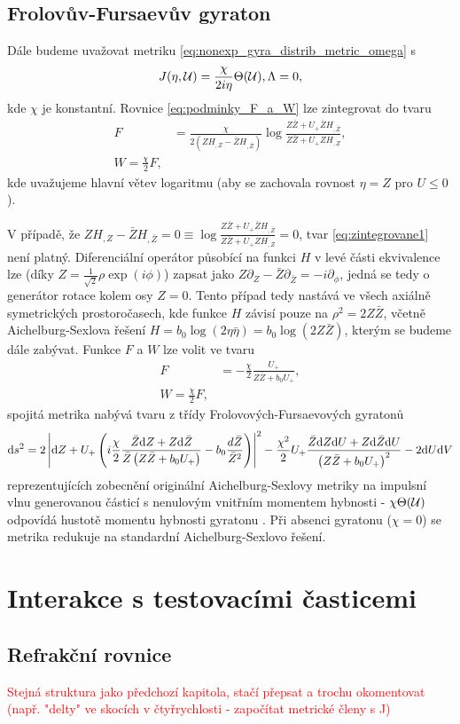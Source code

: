\subsection{Frolovův-Fursaevův gyraton}
Dále budeme uvažovat metriku \eqref{eq:nonexp_gyra_distrib_metric_omega} s
\begin{equation}
    J(\eta , \mathcal{U}) = \frac{\chi}{2 i \eta} \Theta( \mathcal{U} ), \Lambda = 0,
\end{equation}
kde $\chi$ je konstantní. Rovnice \eqref{eq:podminky_F_a_W} lze zintegrovat do tvaru
\begin{equation}
    \label{eq:zintegrovane1}
    \begin{split}
        F &= \frac{\chi}{2(Z H_{,Z}-\bar{Z}H_{,\bar{Z}})} \log \frac{Z\bar{Z}+U_{+}\bar{Z}H_{,\bar{Z}}}{Z\bar{Z}+U_{+}ZH_{,Z}}, \\
        W = \frac{\chi}{2}F,
    \end{split}
\end{equation}
kde uvažujeme hlavní větev logaritmu (aby se zachovala rovnost $\eta = Z$ pro $U \leq 0$).

V případě, že $Z H_{,Z} - \bar{Z}H_{,\bar{Z}}=0 \equiv \log \frac{Z \bar{Z} + U_{+}\bar{Z}H_{,\bar{Z}}}{Z\bar{Z}+U_{+}ZH_{,Z}}=0$,
tvar \eqref{eq:zintegrovane1} není platný. Diferenciální operátor působící na funkci $H$ v levé části ekvivalence
lze (díky $Z = \frac{1}{\sqrt{2}} \rho \exp(i \phi)$) zapsat jako $Z \partial_Z - \bar{Z}\partial_{\bar{Z}} = - i \partial_\phi$,
jedná se tedy o generátor rotace kolem osy $Z = 0$. Tento případ tedy nastává ve všech axiálně symetrických prostoročasech, kde
funkce $H$ závisí pouze na $\rho^2 = 2 Z \bar{Z}$, včetně Aichelburg-Sexlova řešení
$H = b_0 \log(2\eta \bar{\eta}) = b_0 \log (2Z \bar{Z})$, kterým se budeme dále zabývat.
Funkce $F$ a $W$ lze volit ve tvaru
\begin{equation}
    \begin{split}
        F &= -\frac{\chi}{2} \frac{U_{+}}{Z \bar{Z} + b_0 U_{+}}, \\
        W = \frac{\chi}{2}F,
    \end{split}
\end{equation}
spojitá metrika nabývá tvaru z třídy Frolovových-Fursaevových gyratonů \cite{Frolov2005} 
\begin{equation}
    \mathrm{d} s^2 = 2 \left| \mathrm{d} Z + U_{+} \left(i \frac{\chi}{2}\frac{\bar{Z}\mathrm{d} Z + Z \mathrm{d} \bar{Z}}{\bar{Z}\left(Z \bar{Z} + b_0 U_{+}\right)} - b_0 \frac{d\bar{Z}}{\bar{Z}^2}\right) \right|^2
    - \frac{\chi^2}{2}U_{+}\frac{\bar{Z} \mathrm{d} Z \mathrm{d} U + Z \mathrm{d} \bar{Z} \mathrm{d} U}{\left(Z \bar{Z} + b_0 U_{+}\right)^2} - 2 \mathrm{d} U \mathrm{d} V
\end{equation}
reprezentujících zobecnění
originální Aichelburg-Sexlovy metriky \cite{Aichelburg_1971} na impulsní vlnu generovanou částicí s
nenulovým vnitřním momentem hybnosti - $\chi \Theta(\mathcal{U})$ odpovídá hustotě momentu hybnosti gyratonu \cite{Podolsky2014}.
Při absenci gyratonu ($\chi=0$) se metrika redukuje na standardní Aichelburg-Sexlovo řešení.

\section{Interakce s testovacími časticemi}
\subsection{Refrakční rovnice}
\textcolor{red}{Stejná struktura jako předchozí kapitola, stačí přepsat a trochu okomentovat
(např. "delty" ve skocích v čtyřrychlosti - započítat metrické členy s J)}